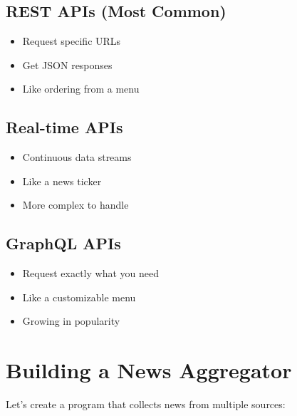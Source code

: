 \documentclass[
  letterpaper,
  DIV=11,
  numbers=noendperiod,
  oneside]{scrreprt}
\providecommand{\tightlist}{%
  \setlength{\itemsep}{0pt}\setlength{\parskip}{0pt}}\usepackage{longtable,booktabs,array}
\begin{document}
\subsection{REST APIs (Most Common)}\label{rest-apis-most-common}

\begin{itemize}
\tightlist
\item
  Request specific URLs
\item
  Get JSON responses
\item
  Like ordering from a menu
\end{itemize}

\subsection{Real-time APIs}\label{real-time-apis}

\begin{itemize}
\tightlist
\item
  Continuous data streams
\item
  Like a news ticker
\item
  More complex to handle
\end{itemize}

\subsection{GraphQL APIs}\label{graphql-apis}

\begin{itemize}
\tightlist
\item
  Request exactly what you need
\item
  Like a customizable menu
\item
  Growing in popularity
\end{itemize}

\section{Building a News Aggregator}\label{building-a-news-aggregator}

Let's create a program that collects news from multiple sources:
\end{document}
